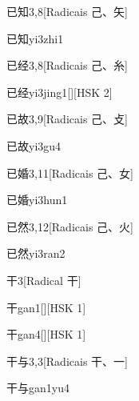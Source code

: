 \begin{entry}{已知}{3,8}[Radicais ⼰、⽮]
  \begin{phonetics}{已知}{yi3zhi1}
  \end{phonetics}
\end{entry}

\begin{entry}{已经}{3,8}[Radicais ⼰、⽷]
  \begin{phonetics}{已经}{yi3jing1}[][HSK 2]
  \end{phonetics}
\end{entry}

\begin{entry}{已故}{3,9}[Radicais ⼰、⽁]
  \begin{phonetics}{已故}{yi3gu4}
  \end{phonetics}
\end{entry}

\begin{entry}{已婚}{3,11}[Radicais ⼰、⼥]
  \begin{phonetics}{已婚}{yi3hun1}
  \end{phonetics}
\end{entry}

\begin{entry}{已然}{3,12}[Radicais ⼰、⽕]
  \begin{phonetics}{已然}{yi3ran2}
  \end{phonetics}
\end{entry}

\begin{entry}{干}{3}[Radical ⼲]
  \begin{phonetics}{干}{gan1}[][HSK 1]
  \end{phonetics}
  \begin{phonetics}{干}{gan4}[][HSK 1]
  \end{phonetics}
\end{entry}

\begin{entry}{干与}{3,3}[Radicais ⼲、⼀]
  \begin{phonetics}{干与}{gan1yu4}
  \end{phonetics}
\end{entry}

